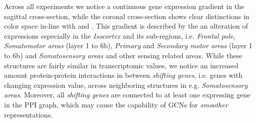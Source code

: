 \documentclass[]{article}
\begin{document}
Across all experiments we notice a continuous gene expression gradient in the sagittal cross-section, while the coronal cross-section shows clear distinctions in color space in-line with \citet{Partel2020} and \citet{sansom2009gradients}. This gradient is described by the an alteration of expressions especially in the \textit{Isocortex} and its sub-regions, i.e. \textit{Frontal pole}, \textit{Somatomotor areas} (layer 1 to 6b), \textit{Primary}  and \textit{Secondary motor areas} (layer 1 to 6b) and \textit{Somatosensory areas} and other sensing related areas. While these structures are fairly similar in transcriptomic values, we notice an increased amount protein-protein interactions in between \textit{shifting genes}, i.e. genes with changing expression value, across neighboring structures in e.g. \textit{Somatosensory areas}. Moreover, all \textit{shifting genes} are connected to at least one expressing gene in the PPI graph, which may cause the capability of GCNs for \textit{smoother} representations. \\
\end{document}
